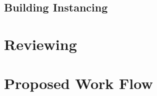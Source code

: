 \subsection{Building Instancing}



\section{Reviewing}

\section{Proposed Work Flow}


%

%

%

%

%

%

